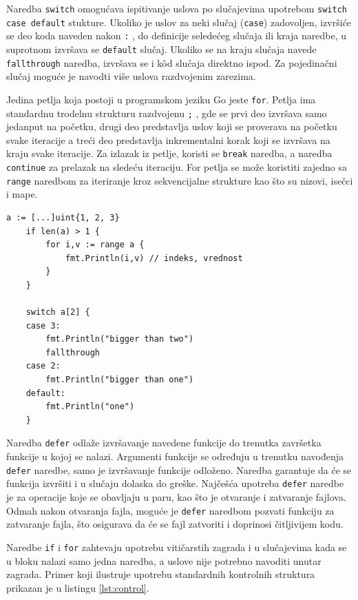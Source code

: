 \documentclass[12pt,oneside]{memoir}
\begin{document}
Naredba \texttt{switch} omogućava ispitivanje uslova po slučajevima upotrebom \texttt{switch case default} stukture. Ukoliko je uslov za neki slučaj (\texttt{case}) zadovoljen, izvršiće se deo koda naveden nakon \texttt{:} , do definicije seledećeg slučaja ili kraja naredbe, u suprotnom izvršava se \texttt{default} slučaj. Ukoliko se na kraju slučaja navede \texttt{fallthrough} naredba, izvršava se i k\^{o}d slučaja direktno ispod. Za pojedinačni slučaj moguće je navodti više uslova razdvojenim zarezima. 

Jedina petlja koja postoji u programskom jeziku Go jeste \texttt{for}. Petlja ima standardnu trodelnu strukturu razdvojenu \texttt{;} , gde se prvi deo  izvršava samo jedanput na početku, drugi deo predstavlja uslov koji se proverava na početku svake iteracije a treći deo predstavlja inkrementalni korak koji se izvršava na kraju svake iteracije. Za izlazak iz petlje, koristi se \texttt{break} naredba, a naredba \texttt{continue} za prelazak na sledeću iteraciju. For petlja se može koristiti zajedno sa \texttt{range} naredbom za iteriranje kroz sekvencijalne strukture kao što su nizovi, isečci i mape. 

\begin{center}
\begin{lstlisting}[caption=Primer koji demonstrira upotrebu kontrolnih struktura, label={lst:control},  backgroundcolor=\color{background}]
	a := [...]uint{1, 2, 3}
	if len(a) > 1 {
		for i,v := range a {	
			fmt.Println(i,v) // indeks, vrednost
		}
	}

	switch a[2] {
    case 3:
        fmt.Println("bigger than two")
		fallthrough
    case 2:
        fmt.Println("bigger than one")
    default:
        fmt.Println("one")
    }
\end{lstlisting}
\end{center}

Naredba \texttt{defer} odlaže izvršavanje navedene funkcije do trenutka završetka funkcije u kojoj se nalazi. Argumenti funkcije se određuju u trenutku navođenja \texttt{defer} naredbe, samo je izvršavanje funkcije odloženo. Naredba garantuje da će se funkcija izvršiti i u slučaju dolaska do greške. Najčešća upotreba \texttt{defer} naredbe je za operacije koje se obavljaju u paru, kao što je otvaranje i zatvaranje fajlova. Odmah nakon otvaranja fajla, moguće je \texttt{defer} naredbom pozvati funkciju za zatvaranje fajla, što osigurava da će se fajl zatvoriti i doprinosi čitljivijem kodu. 

Naredbe \texttt{if} i \texttt{for} zahtevaju upotrebu vitičarstih zagrada i u slučajevima kada se u bloku nalazi samo jedna naredba, a uslove nije potrebno navoditi unutar zagrada. Primer koji ilustruje upotrebu standardnih kontrolnih struktura prikazan je u listingu \ref{lst:control}. 
\end{document}
